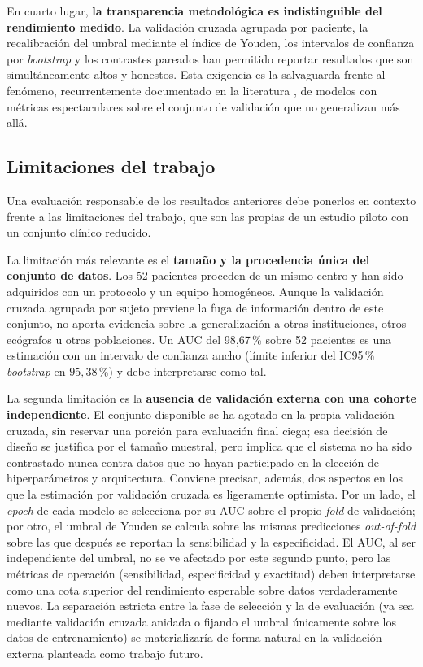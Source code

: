 \documentclass[12pt]{extarticle}
\numberwithin{equation}{section}
\begin{document}
\begin{refsection}
En cuarto lugar, \textbf{la transparencia metodológica es indistinguible del rendimiento medido}. La validación cruzada agrupada por paciente, la recalibración del umbral mediante el índice de Youden, los intervalos de confianza por \textit{bootstrap} y los contrastes pareados han permitido reportar resultados que son simultáneamente altos y honestos. Esta exigencia es la salvaguarda frente al fenómeno, recurrentemente documentado en la literatura \cite{roberts2021common}, de modelos con métricas espectaculares sobre el conjunto de validación que no generalizan más allá.

\subsection{Limitaciones del trabajo}\label{subsec:conc-limitaciones}

Una evaluación responsable de los resultados anteriores debe ponerlos en contexto frente a las limitaciones del trabajo, que son las propias de un estudio piloto con un conjunto clínico reducido.

La limitación más relevante es el \textbf{tamaño y la procedencia única del conjunto de datos}. Los 52 pacientes proceden de un mismo centro y han sido adquiridos con un protocolo y un equipo homogéneos. Aunque la validación cruzada agrupada por sujeto previene la fuga de información dentro de este conjunto, no aporta evidencia sobre la generalización a otras instituciones, otros ecógrafos u otras poblaciones. Un AUC del 98{,}67\,\% sobre 52 pacientes es una estimación con un intervalo de confianza ancho (límite inferior del IC95\,\% \textit{bootstrap} en $95{,}38$\,\%) y debe interpretarse como tal.

La segunda limitación es la \textbf{ausencia de validación externa con una cohorte independiente}. El conjunto disponible se ha agotado en la propia validación cruzada, sin reservar una porción para evaluación final ciega; esa decisión de diseño se justifica por el tamaño muestral, pero implica que el sistema no ha sido contrastado nunca contra datos que no hayan participado en la elección de hiperparámetros y arquitectura. Conviene precisar, además, dos aspectos en los que la estimación por validación cruzada es ligeramente optimista. Por un lado, el \textit{epoch} de cada modelo se selecciona por su AUC sobre el propio \textit{fold} de validación; por otro, el umbral de Youden se calcula sobre las mismas predicciones \textit{out-of-fold} sobre las que después se reportan la sensibilidad y la especificidad. El AUC, al ser independiente del umbral, no se ve afectado por este segundo punto, pero las métricas de operación (sensibilidad, especificidad y exactitud) deben interpretarse como una cota superior del rendimiento esperable sobre datos verdaderamente nuevos. La separación estricta entre la fase de selección y la de evaluación (ya sea mediante validación cruzada anidada o fijando el umbral únicamente sobre los datos de entrenamiento) se materializaría de forma natural en la validación externa planteada como trabajo futuro.


\end{refsection}
\end{document}
